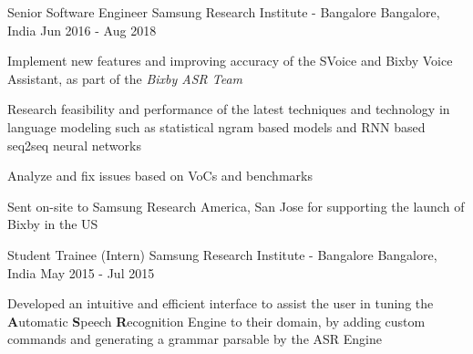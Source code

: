 

\begin{cventries}

  \cventry
    {Senior Software Engineer} %
    {Samsung Research Institute - Bangalore} %
    {Bangalore, India} %
    {Jun 2016 - Aug 2018} %
    {
      \begin{cvitems}
      \item{Implement new features and improving accuracy of the SVoice and Bixby Voice Assistant, as part of the \textit{Bixby ASR Team}}
      \item{Research feasibility and performance of the latest techniques and technology in language modeling such as statistical ngram based models and RNN based seq2seq neural networks}
      \item{Analyze and fix issues based on VoCs and benchmarks}
      \item{Sent on-site to Samsung Research America, San Jose for supporting the launch of Bixby in the US}
      \end{cvitems}
    }

  \cventry
    {Student Trainee (Intern)} %
    {Samsung Research Institute - Bangalore} %
    {Bangalore, India} %
    {May 2015 - Jul 2015} %
    {
      \begin{cvitems}
      \item{Developed an intuitive and efficient interface to assist the user in tuning the \textbf{A}utomatic  \textbf{S}peech \textbf{R}ecognition Engine to their domain, by adding custom commands and generating a grammar parsable by the ASR  Engine}
      \end{cvitems}
    }


\end{cventries}

